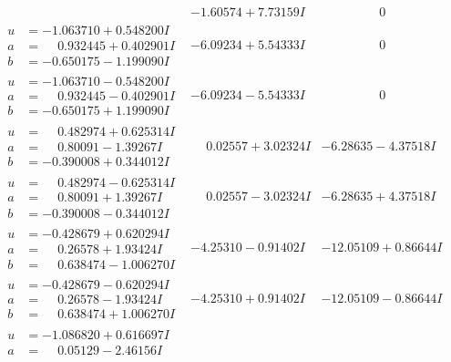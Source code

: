 \documentclass[1p]{elsarticle_modified}
\theoremstyle{definition}
\begin{document}
$$\begin{array}{c|c|c}
 & -1.60574 + 7.73159 I & \phantom{-0.000000 } 0 \\ \hline\begin{aligned}
u &= -1.063710 + 0.548200 I \\
a &= \phantom{-}0.932445 + 0.402901 I \\
b &= -0.650175 - 1.199090 I\end{aligned}
 & -6.09234 + 5.54333 I & \phantom{-0.000000 } 0 \\ \hline\begin{aligned}
u &= -1.063710 - 0.548200 I \\
a &= \phantom{-}0.932445 - 0.402901 I \\
b &= -0.650175 + 1.199090 I\end{aligned}
 & -6.09234 - 5.54333 I & \phantom{-0.000000 } 0 \\ \hline\begin{aligned}
u &= \phantom{-}0.482974 + 0.625314 I \\
a &= \phantom{-}0.80091 - 1.39267 I \\
b &= -0.390008 + 0.344012 I\end{aligned}
 & \phantom{-}0.02557 + 3.02324 I & -6.28635 - 4.37518 I \\ \hline\begin{aligned}
u &= \phantom{-}0.482974 - 0.625314 I \\
a &= \phantom{-}0.80091 + 1.39267 I \\
b &= -0.390008 - 0.344012 I\end{aligned}
 & \phantom{-}0.02557 - 3.02324 I & -6.28635 + 4.37518 I \\ \hline\begin{aligned}
u &= -0.428679 + 0.620294 I \\
a &= \phantom{-}0.26578 + 1.93424 I \\
b &= \phantom{-}0.638474 - 1.006270 I\end{aligned}
 & -4.25310 - 0.91402 I & -12.05109 + 0.86644 I \\ \hline\begin{aligned}
u &= -0.428679 - 0.620294 I \\
a &= \phantom{-}0.26578 - 1.93424 I \\
b &= \phantom{-}0.638474 + 1.006270 I\end{aligned}
 & -4.25310 + 0.91402 I & -12.05109 - 0.86644 I \\ \hline\begin{aligned}
u &= -1.086820 + 0.616697 I \\
a &= \phantom{-}0.05129 - 2.46156 I \\

\end{aligned}
\end{array}$$
\end{document}

